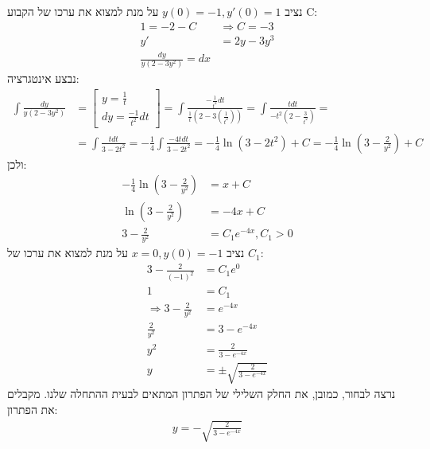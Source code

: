 \documentclass{article}
\begin{document}
נציב $y(0)=-1, y'(0)=1$ על מנת למצוא את ערכו של הקבוע C:
\begin{align*}
    1=-2-C & \Rightarrow C = -3 \\
    y'     & =2y-3y^3           \\
    \frac{dy}{y(2-3y^2)}=dx
\end{align*}
נבצע אינטגרציה:
\begin{align*}
    \int \frac{dy}{y(2-3y^2)} & =\begin{bmatrix}
                                     y=\frac{1}{t} \\
                                     dy = \frac{-1}{t^2}dt
                                 \end{bmatrix}
    = \int \frac{-\frac{1}{t^2}dt}{\frac{1}{t}(2-3(\frac{1}{t^2}))}
    = \int \frac{tdt}{-t^2(2-\frac{3}{t^2})} =            \\
                              & = \int \frac{tdt}{3-2t^2}
    = -\frac{1}{4} \int \frac{-4tdt}{3-2t^2}
    = -\frac{1}{4}\ln(3-2t^2)+C
    = -\frac{1}{4}\ln(3-\frac{2}{y^2})+C
\end{align*}
ולכן:
\begin{align*}
    -\frac{1}{4}\ln(3-\frac{2}{y^2}) & = x + C            \\
    \ln(3-\frac{2}{y^2})             & = -4x + C          \\
    3-\frac{2}{y^2}                  & =C_1e^{-4x}, C_1>0
\end{align*}
נציב $x=0, y(0)=-1$ על מנת למצוא את ערכו של $C_1$:
\begin{align*}
    3-\frac{2}{(-1)^2}          & =C_1e^0                          \\
    1                           & =C_1                             \\
    \Rightarrow 3-\frac{2}{y^2} & =e^{-4x}                         \\
    \frac{2}{y^2}               & = 3-e^{-4x}                      \\
    y^2                         & = \frac{2}{3-e^{-4x}}            \\
    y                           & = \pm \sqrt{\frac{2}{3-e^{-4x}}}
\end{align*}
נרצה לבחור, כמובן, את החלק השלילי של הפתרון המתאים לבעית ההתחלה שלנו. מקבלים את הפתרון:
\begin{align*}
    y=-\sqrt{\frac{2}{3-e^{-4x}}}
\end{align*}

\pagebreak
\end{document}
